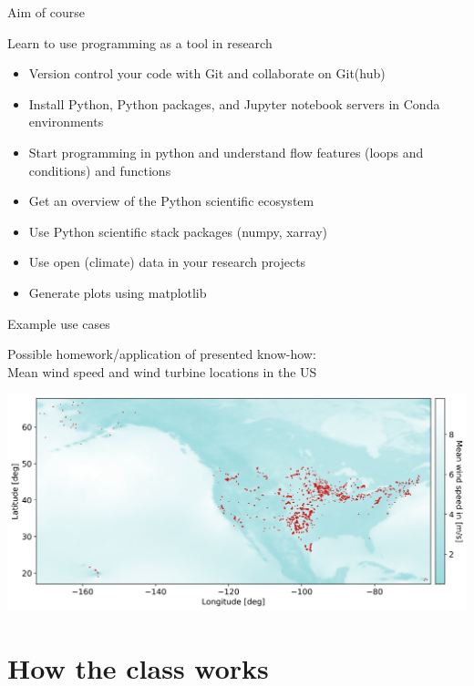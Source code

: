 \begin{frame}{Aim of course}

	Learn to use programming as a tool in research

	\begin{itemize}
		\item Version control your code with Git and collaborate on Git(hub)
		\item Install Python, Python packages, and Jupyter notebook servers in Conda environments
		\item Start programming in python and understand flow features (loops and conditions) and functions
		\item Get an overview of the Python scientific ecosystem
		\item Use Python scientific stack packages (numpy, xarray)
		\item Use open (climate) data in your research projects
		\item Generate plots using matplotlib
	\end{itemize}

\end{frame}

\begin{frame}{Example use cases}

	Possible homework/application of presented know-how:\\

    Mean wind speed and wind turbine locations in the US

    \includegraphics[width=\textwidth]{mean_wind_speed_and_turbines.png}\\

\end{frame}

\section{How the class works}

